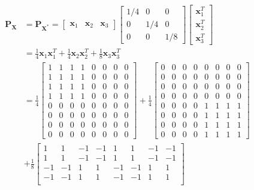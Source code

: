 \documentclass{article}
\begin{document}
\begin{enumerate}[leftmargin = 0 em, label = \arabic*., font = \bfseries]
\begin{enumerate}
	\begin{align*}
	\bm P_{\bm X} &= \bm P_{\bm X^*} = \begin{bmatrix}
		\bm x_1 & \bm x_2 & \bm x_3
	\end{bmatrix} \begin{bmatrix}
		1/4 & 0 & 0\\
		0 & 1/4 & 0\\
		0 & 0 & 1/8
	\end{bmatrix}\begin{bmatrix}
		\bm x_1^T\\
		\bm x_2^T\\
		\bm x_3^T
	\end{bmatrix} \\
	&= \frac{1}{4} \bm x_1 \bm x_1^T + \frac{1}{4}\bm x_2 \bm x_2^T + \frac{1}{8} \bm x_3 \bm x_3^T\\
	& = \frac{1}{4}\begin{bmatrix}
		1 & 1 & 1 & 1 & 0 & 0 & 0 & 0\\
		1 & 1 & 1 & 1 & 0 & 0 & 0 & 0\\
		1 & 1 & 1 & 1 & 0 & 0 & 0 & 0\\
		1 & 1 & 1 & 1 & 0 & 0 & 0 & 0\\
		0  & 0 & 0 & 0 & 0 & 0 & 0 & 0\\
		0  & 0 & 0 & 0 & 0 & 0 & 0 & 0\\
		0  & 0 & 0 & 0 & 0 & 0 & 0 & 0\\
		0  & 0 & 0 & 0 & 0 & 0 & 0 & 0
	\end{bmatrix} 
	+ \frac{1}{4}\begin{bmatrix}
		0  & 0 & 0 & 0 & 0 & 0 & 0 & 0\\
		0  & 0 & 0 & 0 & 0 & 0 & 0 & 0\\
		0  & 0 & 0 & 0 & 0 & 0 & 0 & 0\\
		0  & 0 & 0 & 0 & 0 & 0 & 0 & 0\\
		0 & 0 & 0 & 0 & 1 & 1 & 1 & 1 \\
		0 & 0 & 0 & 0 & 1 & 1 & 1 & 1 \\
		0 & 0 & 0 & 0 & 1 & 1 & 1 & 1 \\
		0 & 0 & 0 & 0 & 1 & 1 & 1 & 1 
	\end{bmatrix}\\
	&+ \frac{1}{8} \begin{bmatrix}
		1 & 1 & -1 & -1 & 1 & 1 & -1 & -1\\
		1 & 1 & -1 & -1 & 1 & 1 & -1 & -1\\
		-1 & -1 & 1 & 1 & -1 & -1 & 1 & 1\\
		-1 & -1 & 1 & 1 & -1 & -1 & 1 & 1\\

\end{bmatrix}
\end{align*}
\end{enumerate}
\end{enumerate}
\end{document}
